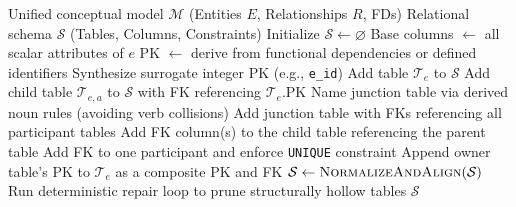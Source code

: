 \begin{algorithm}[t]
\caption{Deterministic Relational Mapping}
\label{alg:map}
\begin{algorithmic}[1]
  \Require Unified conceptual model $\mathcal{M}$ (Entities $E$, Relationships $R$, FDs)
  \Ensure Relational schema $\mathcal{S}$ (Tables, Columns, Constraints)
  \State Initialize $\mathcal{S} \gets \varnothing$
    \State Base columns $\gets$ all scalar attributes of $e$
    \State PK $\gets$ derive from functional dependencies or defined identifiers
      \State Synthesize surrogate integer PK (e.g., \texttt{e\_id})
    \EndIf
    \State Add table $\mathcal{T}_e$ to $\mathcal{S}$
      \State Add child table $\mathcal{T}_{e,a}$ to $\mathcal{S}$ with FK referencing $\mathcal{T}_e$.PK
    \EndFor
  \EndFor
      \State Name junction table via derived noun rules (avoiding verb collisions)
      \State Add junction table with FKs referencing all participant tables
      \State Add FK column(s) to the child table referencing the parent table
      \State Add FK to one participant and enforce \texttt{UNIQUE} constraint
    \EndIf
  \EndFor
    \State Append owner table's PK to $\mathcal{T}_e$ as a composite PK and FK
  \EndFor
  \State $\mathcal{S} \gets \textsc{NormalizeAndAlign}(\mathcal{S})$ 
  \State Run deterministic repair loop to prune structurally hollow tables
  \State \Return $\mathcal{S}$
\end{algorithmic}
\end{algorithm}
